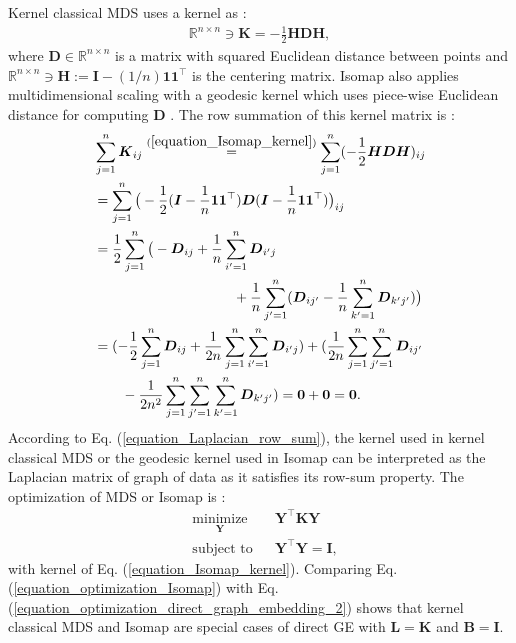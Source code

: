 \documentclass[lang=cn,10pt]{gorgeousnbook}
\numberwithin{equation}{section}%
\numberwithin{figure}{section}%
\begin{document}
Kernel classical MDS uses a kernel as \cite{ghojogh2020multidimensional}:
\begin{align}\label{equation_Isomap_kernel}
\mathbb{R}^{n \times n} \ni \boldsymbol{K} = -\frac{1}{2} \boldsymbol{H} \boldsymbol{D} \boldsymbol{H},
\end{align}
where $\boldsymbol{D} \in \mathbb{R}^{n \times n}$ is a matrix with squared Euclidean distance between points and $\mathbb{R}^{n \times n} \ni \boldsymbol{H} := \boldsymbol{I} - (1/n) \boldsymbol{1} \boldsymbol{1}^\top$ is the centering matrix. 
Isomap also applies multidimensional scaling with a geodesic kernel which uses piece-wise Euclidean distance for computing $\boldsymbol{D}$ \cite{tenenbaum2000global,ghojogh2020multidimensional}.
The row summation of this kernel matrix is \cite{yan2005graph,yan2006graph}: 
\begin{align*}
&\sum_{j=1}^n \boldsymbol{K}_{ij} \overset{(\ref{equation_Isomap_kernel})}{=} \sum_{j=1}^n (-\frac{1}{2} \boldsymbol{H} \boldsymbol{D} \boldsymbol{H})_{ij} \\
&= \sum_{j=1}^n \big(-\frac{1}{2} (\boldsymbol{I} - \frac{1}{n} \boldsymbol{1} \boldsymbol{1}^\top) \boldsymbol{D} (\boldsymbol{I} - \frac{1}{n} \boldsymbol{1} \boldsymbol{1}^\top)\big)_{ij} \\
&= \frac{1}{2} \sum_{j=1}^n \big( -\boldsymbol{D}_{ij} + \frac{1}{n} \sum_{i'=1}^n \boldsymbol{D}_{i' j} \\
&~~~~~~~~~~~~~~~~~~~~~~~~~~~~~~ + \frac{1}{n} \sum_{j'=1}^n (\boldsymbol{D}_{i j'} - \frac{1}{n} \sum_{k'=1}^n \boldsymbol{D}_{k' j'}) \big) \\
&= (-\frac{1}{2} \sum_{j=1}^n \boldsymbol{D}_{ij} + \frac{1}{2n} \sum_{j=1}^n \sum_{i'=1}^n \boldsymbol{D}_{i' j}) + (\frac{1}{2n} \sum_{j=1}^n \sum_{j'=1}^n \boldsymbol{D}_{i j'} \\
&~~~~~~ - \frac{1}{2n^2} \sum_{j=1}^n \sum_{j'=1}^n \sum_{k'=1}^n \boldsymbol{D}_{k' j'}) = \boldsymbol{0} + \boldsymbol{0} = \boldsymbol{0}.
\end{align*}
According to Eq. (\ref{equation_Laplacian_row_sum}), the kernel used in kernel classical MDS or the geodesic kernel used in Isomap can be interpreted as the Laplacian matrix of graph of data as it satisfies its row-sum property. 
The optimization of MDS or Isomap is \cite{ghojogh2020multidimensional}:
\begin{equation}\label{equation_optimization_Isomap}
\begin{aligned}
& \underset{\boldsymbol{Y}}{\text{minimize}}
& & \boldsymbol{Y}^\top \boldsymbol{K} \boldsymbol{Y} \\
& \text{subject to}
& & 
\boldsymbol{Y}^\top \boldsymbol{Y} = \boldsymbol{I},
\end{aligned}
\end{equation}
with kernel of Eq. (\ref{equation_Isomap_kernel}). 
Comparing Eq. (\ref{equation_optimization_Isomap}) with Eq. (\ref{equation_optimization_direct_graph_embedding_2}) shows that kernel classical MDS and Isomap are special cases of direct GE with $\boldsymbol{L} = \boldsymbol{K}$ and $\boldsymbol{B} = \boldsymbol{I}$. 
\end{document}
